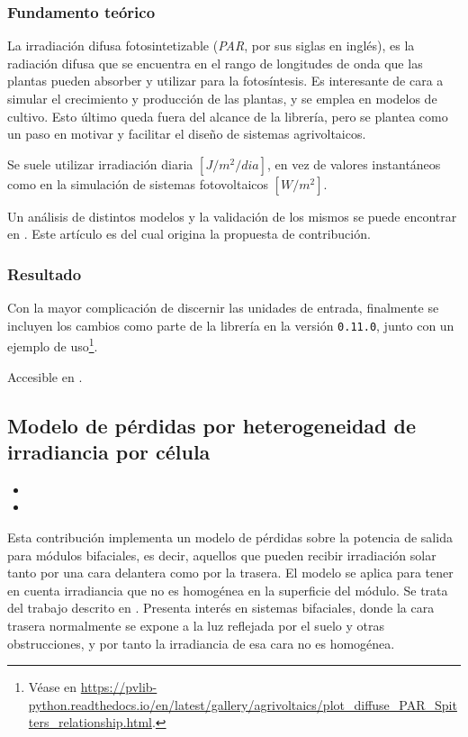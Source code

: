 \subsubsection{Fundamento teórico}

La irradiación difusa fotosintetizable (\textit{PAR}, por sus siglas en inglés), es la radiación difusa que se encuentra en el rango de longitudes de onda que las plantas pueden absorber y utilizar para la fotosíntesis. Es interesante de cara a simular el crecimiento y producción de las plantas, y se emplea en modelos de cultivo. Esto último queda fuera del alcance de la librería, pero se plantea como un paso en motivar y facilitar el diseño de sistemas agrivoltaicos.

Se suele utilizar irradiación diaria $[J/m^2/dia]$, en vez de valores instantáneos como en la simulación de sistemas fotovoltaicos $[W/m^2]$.

Un análisis de distintos modelos y la validación de los mismos se puede encontrar en \cite{Ma_Lu_Zainali_Stridh_Avelin_Amaducci_Colauzzi_Campana_2022}. Este artículo es del cual origina la propuesta de contribución.

\subsubsection{Resultado}

Con la mayor complicación de discernir las unidades de entrada, finalmente se incluyen los cambios como parte de la librería en la versión \texttt{0.11.0}, junto con un ejemplo de uso\footnote{Véase en \url{https://pvlib-python.readthedocs.io/en/latest/gallery/agrivoltaics/plot_diffuse_PAR_Spitters_relationship.html}.}.

Accesible en .

\subsection{Modelo de pérdidas por heterogeneidad de irradiancia por célula}

\begin{itemize}
    \item {}
    \item {}
\end{itemize}

Esta contribución implementa un modelo de pérdidas sobre la potencia de salida para módulos bifaciales, es decir, aquellos que pueden recibir irradiación solar tanto por una cara delantera como por la trasera. El modelo se aplica para tener en cuenta irradiancia que no es homogénea en la superficie del módulo. Se trata del trabajo descrito en \cite{Deline_Ayala_Pelaez_MacAlpine_Olalla_2020}.
Presenta interés en sistemas bifaciales, donde la cara trasera normalmente se expone a la luz reflejada por el suelo y otras obstrucciones, y por tanto la irradiancia de esa cara no es homogénea.

